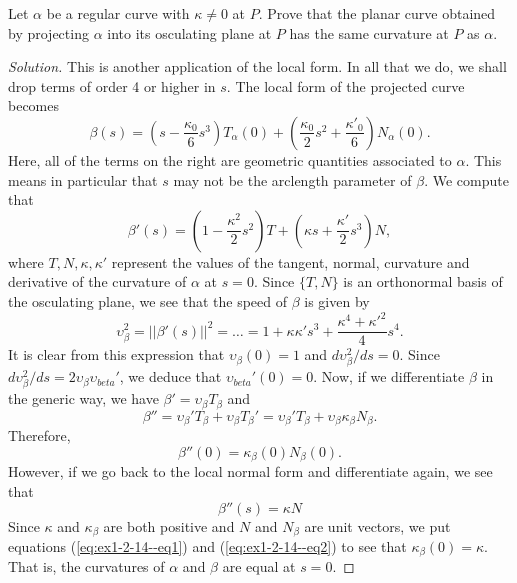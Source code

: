 \documentclass[Shifrin_Solutions_Spring_2018]{subfiles}
\begin{document}
\vspace{.5cm}


\begin{exercise}
Let $\alpha$ be a regular curve with $\kappa \neq 0$ at $P$. Prove that the planar curve obtained by projecting $\alpha$ into its osculating plane at $P$ has the same curvature at $P$ as $\alpha$.
\end{exercise}

\begin{proof}[Solution]
This is another application of the local form. In all that we do, we shall drop terms of order 4 or higher in $s$. The local form of the projected curve becomes
\[
\beta(s) = \left(s - \dfrac{\kappa_0}{6} s^3 \right) T_{\alpha}(0) + \left( \dfrac{\kappa_0}{2}s^2 + \dfrac{\kappa'_0}{6} \right) N_{\alpha}(0) .
\]
Here, all of the terms on the right are geometric quantities associated to $\alpha$. This means in particular that $s$ may not be the arclength parameter of $\beta$.
We compute that
\[
\beta'(s) = \left( 1 - \dfrac{\kappa^2}{2}s^2\right) T + \left( \kappa s + \dfrac{\kappa'}{2}s^3\right) N,
\]
where $T, N, \kappa, \kappa'$ represent the values of the tangent, normal, curvature and derivative of the curvature of $\alpha$ at $s=0$. Since $\{T, N\}$ is an orthonormal basis of the osculating plane, we see that the speed of $\beta$ is given by
\[
\upsilon_{\beta}^2 = ||\beta'(s)||^2 = \dots = 1 + \kappa\kappa' s^3 + \dfrac{\kappa^4 + {\kappa'}^2}{4}s^4 .
\]
It is clear from this expression that $\upsilon_{\beta}(0) = 1$ and $d\upsilon_{\beta}^2/ds = 0$. Since $d\upsilon_{\beta}^2/ds = 2\upsilon_{\beta} \upsilon_{beta}'$, we deduce that $\upsilon_{beta}'(0) = 0.$
Now, if we differentiate $\beta$ in the generic way, we have $\beta' = \upsilon_{\beta} T_{\beta}$ and
\[
\beta'' = \upsilon_{\beta}' T_{\beta} + \upsilon_{\beta}T_{\beta}' = \upsilon_{\beta}' T_{\beta} + \upsilon_{\beta}\kappa_{\beta}N_{\beta} .
\]
Therefore,
\begin{equation}\label{eq:ex1-2-14--eq1}
\beta''(0) =  \kappa_{\beta}(0) N_{\beta}(0).
\end{equation}
However, if we go back to the local normal form and differentiate again, we see that
\begin{equation}\label{eq:ex1-2-14--eq2}
\beta''(s) = \kappa N
\end{equation}
Since $\kappa$ and $\kappa_{\beta}$ are both positive and $N$ and $N_{\beta}$ are unit vectors, we put equations (\ref{eq:ex1-2-14--eq1}) and (\ref{eq:ex1-2-14--eq2}) to see that $\kappa_{\beta}(0) = \kappa$. That is, the curvatures of $\alpha$ and $\beta$ are equal at $s=0$.
\end{proof}
\end{document}
